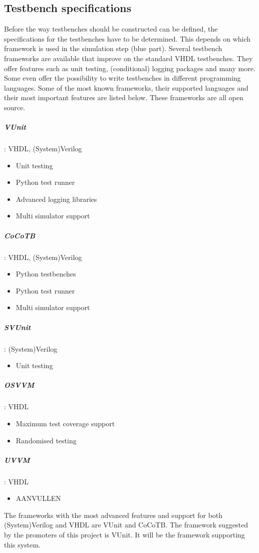 \subsection{Testbench specifications}
Before the way testbenches should be constructed can be defined, the specifications for the testbenches have to be determined. This depends on which framework is used in the simulation step (blue part). Several testbench frameworks are available that improve on the standard VHDL testbenches. They offer features such as unit testing, (conditional) logging packages and many more. Some even offer the possibility to write testbenches in different programming languages.
\npar
Some of the most known frameworks, their supported languages and their most important features are listed below. These frameworks are all open source.
\subparagraph{VUnit}: VHDL, (System)Verilog
\begin{itemize}
	\setlength\itemsep{.1em}
	\item Unit testing
	\item Python test runner
	\item Advanced logging libraries
	\item Multi simulator support
\end{itemize}
\subparagraph{CoCoTB}: VHDL, (System)Verilog
\begin{itemize}
	\setlength\itemsep{.1em}
	\item Python testbenches
	\item Python test runner
	\item Multi simulator support	
\end{itemize}
\subparagraph{SVUnit}\cite{svunit}: (System)Verilog
\begin{itemize}
	\setlength\itemsep{.1em}
	\item Unit testing
\end{itemize}
\subparagraph{OSVVM}\cite{osvvm}: VHDL
\begin{itemize}
	\setlength\itemsep{.1em}
	\item Maximum test coverage support
	\item Randomised testing
\end{itemize}
\subparagraph{UVVM}\cite{uvvm}: VHDL
\begin{itemize}
	\setlength\itemsep{.1em}
	\item AANVULLEN
\end{itemize}\noindent
The frameworks with the most advanced features and support for both (System)Verilog and VHDL are VUnit and CoCoTB. The framework suggested by the promoters of this project is VUnit. It will be the framework supporting this system.
